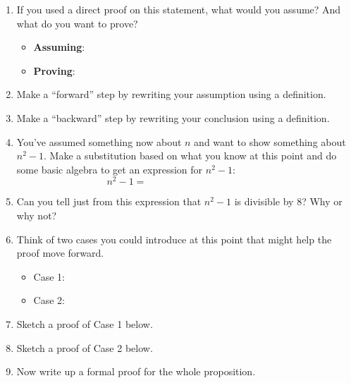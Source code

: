\documentclass[11pt]{article}
\begin{document}
\begin{enumerate}
\begin{enumerate}
		\vspace{1in}
		
		\item If you used a direct proof on this statement, what would you assume? And what do you want to prove? 
		
			\begin{itemize}
				\item \textbf{Assuming}: 
				\item \textbf{Proving}: 
			\end{itemize}
		
		\item Make a ``forward'' step by rewriting your assumption using a definition. 
		
		\vspace{0.7in}
		
		\item Make a ``backward'' step by rewriting your conclusion using a definition. 
		
		\vspace{0.7in}
		
		\item You've assumed something now about $n$ and want to show something about $n^2 - 1$. Make a substitution based on what you know at this point and do some basic algebra to get an expression for $n^2 - 1$:
		\[ n^2 - 1 = \hspace{2in} \] 
		
		\item Can you tell just from this expression that $n^2 - 1$ is divisible by $8$? Why or why not? 
		
		\vspace{0.7in}
		
		\item Think of two cases you could introduce at this point that might help the proof move forward. 
		
		\begin{itemize}
			\item Case 1: 
			\item Case 2: 
		\end{itemize}
		
		\item Sketch a proof of Case 1 below. 
		
		\vspace{1.5in}
		
		\item Sketch a proof of Case 2 below. 
		
		\vspace{1.5in}
		
		\item Now write up a formal proof for the whole proposition. 
		
		
	\end{enumerate}
	

	
\end{enumerate}
\end{document}
